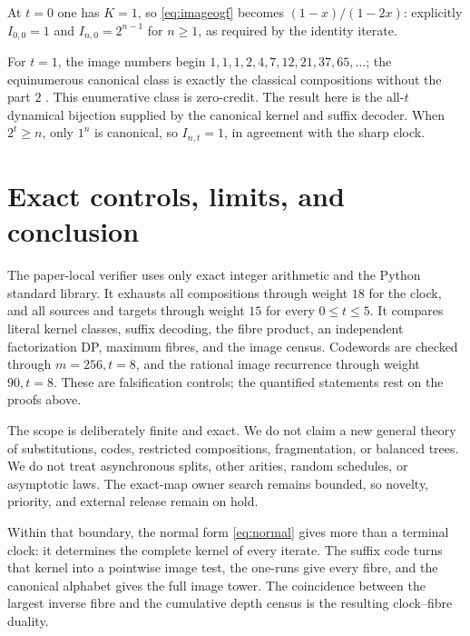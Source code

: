 \documentclass[10pt,a4paper]{amsart}
\theoremstyle{definition}
\theoremstyle{remark}
\begin{document}
At $t=0$ one has $K=1$, so \eqref{eq:imageogf} becomes
$(1-x)/(1-2x)$: explicitly $I_{0,0}=1$ and
$I_{n,0}=2^{n-1}$ for $n\geq1$, as required by the identity iterate.

For $t=1$, the image numbers begin
$1,1,1,2,4,7,12,21,37,65,\ldots$; the equinumerous canonical class is
exactly the classical compositions without the part $2$
\cite{ChinnHeubach2003}.  This enumerative class is zero-credit.  The result
here is the all-$t$ dynamical bijection supplied by the canonical kernel
and suffix decoder.  When $2^t\geq n$, only $1^n$ is canonical, so
$I_{n,t}=1$, in agreement with the sharp clock.

\section{Exact controls, limits, and conclusion}

The paper-local verifier uses only exact integer arithmetic and the Python
standard library.  It exhausts all compositions through weight $18$ for
the clock, and all sources and targets through weight $15$ for every
$0\leq t\leq5$.  It compares literal kernel classes, suffix decoding,
the fibre product, an independent factorization DP, maximum fibres, and the
image census.  Codewords are checked through $m=256,t=8$, and the rational
image recurrence through weight $90,t=8$.  These are falsification
controls; the quantified statements rest on the proofs above.

The scope is deliberately finite and exact.  We do not claim a new general
theory of substitutions, codes, restricted compositions, fragmentation,
or balanced trees.  We do not treat asynchronous splits, other arities,
random schedules, or asymptotic laws.  The exact-map owner search remains
bounded, so novelty, priority, and external release remain on hold.

Within that boundary, the normal form \eqref{eq:normal} gives more than a
terminal clock: it determines the complete kernel of every iterate.  The
suffix code turns that kernel into a pointwise image test, the one-runs give
every fibre, and the canonical alphabet gives the full image tower.  The
coincidence between the largest inverse fibre and the cumulative depth census
is the resulting clock--fibre duality.



\end{document}
